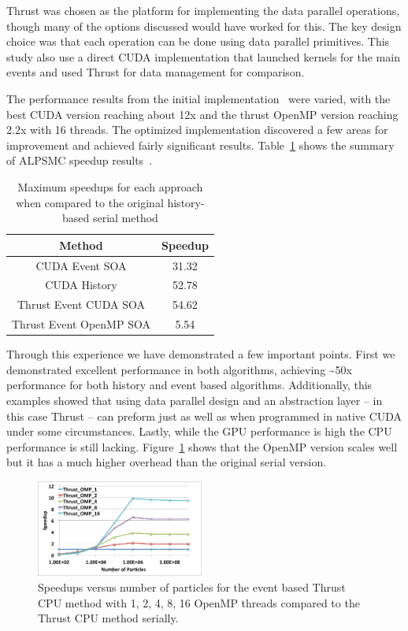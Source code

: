 Thrust was chosen as the platform for implementing the data parallel operations, though many of the options discussed would have worked for this.
%
The key design choice was that each operation can be done using data parallel primitives.
%
This study also use a direct CUDA implementation that launched kernels for the main events and used Thrust for data management for comparison.

The performance results from the initial implementation~\cite{alpsmc1} were varied, with the best CUDA version reaching about 12x and the thrust OpenMP version reaching 2.2x with 16 threads.
%
The optimized implementation discovered a few areas for improvement and achieved fairly significant results.
%
Table~\ref{tab:ALPSspeedup} shows the summary of ALPSMC speedup results~\cite{alpsmc2}.
%

\begin{table}
\caption { Maximum speedups for each approach when compared to the original history-based serial method } \label{tab:ALPSspeedup} 
\begin{center}
\begin{tabular}{ |c|c|}
\hline
Method & Speedup\\
\hline
CUDA Event SOA & 31.32\\
\hline
CUDA History & 52.78\\
\hline
Thrust Event CUDA SOA & 54.62\\
\hline
Thrust Event OpenMP SOA & 5.54\\
\hline
\end{tabular}
\end{center}
\end{table}

Through this experience we have demonstrated a few important points.
%
First we demonstrated excellent performance in both algorithms, achieving \textasciitilde50x performance for both history and event based algorithms.
%
Additionally, this examples showed that using data parallel design and an abstraction layer -- in this case Thrust -- can preform just as well as when programmed in native CUDA under some circumstances. 
%
Lastly, while the GPU performance is high the CPU performance is still lacking.
%
Figure~\ref{fig:OMPScale} shows that the OpenMP version scales well but it has a much higher overhead than the original serial version.

\begin{figure}
\includegraphics[width=0.49\textwidth]{thrustOMPSpeedup.pdf}
\caption{Speedups versus number of particles for the event based Thrust CPU method with 1, 2, 4, 8, 16 OpenMP threads compared to the Thrust CPU method serially.~\cite{alpsmc2}}
\label{fig:OMPScale}
\end{figure}


